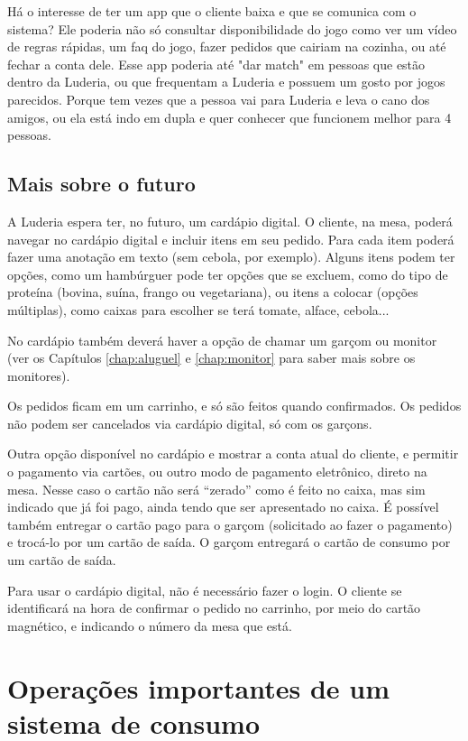 Há o interesse de ter um app que o cliente baixa e que se comunica com o sistema? Ele poderia não só consultar disponibilidade do jogo como ver um vídeo de regras rápidas, um faq do jogo, fazer pedidos que cairiam na cozinha, ou até fechar a conta dele. 
Esse app poderia até "dar match" em pessoas que estão dentro da Luderia, ou que frequentam a Luderia e possuem um gosto por jogos parecidos. Porque tem vezes que a pessoa vai para Luderia e leva o cano dos amigos, ou ela está indo em dupla e quer conhecer que funcionem melhor para 4 pessoas.

\subsection{Mais sobre o futuro}

A Luderia espera ter, no futuro, um cardápio digital. O cliente, na mesa, poderá navegar no cardápio digital e incluir itens em seu pedido. Para cada item poderá fazer uma anotação em texto (sem cebola, por exemplo). Alguns itens podem ter opções, como um hambúrguer pode ter opções que se excluem, como do tipo de proteína (bovina, suína, frango ou vegetariana), ou itens a colocar (opções múltiplas), como caixas para escolher se terá tomate, alface, cebola...

No cardápio também deverá haver a opção de chamar um garçom ou monitor (ver os Capítulos \ref{chap:aluguel} e \ref{chap:monitor} para saber mais sobre os monitores).

Os pedidos ficam em um carrinho, e só são feitos quando confirmados. Os pedidos não podem ser cancelados via cardápio digital, só com os garçons.

Outra opção disponível no cardápio e mostrar a conta atual do cliente, e permitir o pagamento via cartões, ou outro modo de pagamento eletrônico, direto na mesa. Nesse caso o cartão não será ``zerado'' como é feito no caixa, mas sim indicado que já foi pago, ainda tendo que ser apresentado no caixa. É possível também entregar o cartão pago para o garçom (solicitado ao fazer o pagamento) e trocá-lo por um cartão de saída. O garçom entregará o cartão de consumo por um cartão de saída.

Para usar o cardápio digital, não é necessário fazer o login. O cliente se identificará na hora de confirmar o pedido no carrinho, por meio do cartão magnético, e indicando o número da mesa que está.

\section{Operações importantes de um sistema de consumo}

